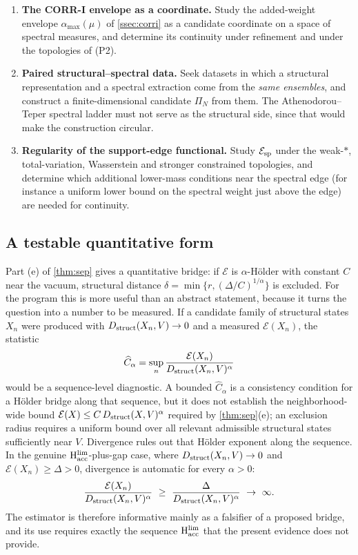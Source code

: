 \documentclass[11pt,a4paper]{article}
\theoremstyle{definition}
\theoremstyle{remark}
\newcommand{\Hacc}{\mathrm{H}_{\mathrm{acc}}}
\begin{document}
\begin{enumerate}[label=(P\arabic*),start=5]
\item \textbf{The CORR-I envelope as a coordinate.} Study the added-weight envelope $\alpha_{\max}(\mu)$ of \cref{ssec:corri} as a candidate coordinate on a space of spectral measures, and determine its continuity under refinement and under the topologies of (P2).
\item \textbf{Paired structural--spectral data.} Seek datasets in which a structural representation and a spectral extraction come from the \emph{same ensembles}, and construct a finite-dimensional candidate $\Pi_N$ from them. The Athenodorou--Teper spectral ladder must not serve as the structural side, since that would make the construction circular.
\item \textbf{Regularity of the support-edge functional.} Study $\mathcal E_{\rm sp}$ under the weak-$*$, total-variation, Wasserstein and stronger constrained topologies, and determine which additional lower-mass conditions near the spectral edge (for instance a uniform lower bound on the spectral weight just above the edge) are needed for continuity.
\end{enumerate}

\subsection{A testable quantitative form}\label{ssec:holder}
Part (e) of \cref{thm:sep} gives a quantitative bridge: if $\mathcal E$ is $\alpha$-H\"older with constant $C$ near the vacuum, structural distance $\delta=\min\{r,(\Delta/C)^{1/\alpha}\}$ is excluded. For the program this is more useful than an abstract statement, because it turns the question into a number to be measured. If a candidate family of structural states $X_n$ were produced with $D_{\rm struct}(X_n,V)\to0$ and a measured $\mathcal E(X_n)$, the statistic
\[
\widehat C_\alpha=\sup_n \frac{\mathcal E(X_n)}{D_{\rm struct}(X_n,V)^{\alpha}}
\]
would be a sequence-level diagnostic. A bounded $\widehat C_\alpha$ is a consistency condition for a H\"older bridge along that sequence, but it does not establish the neighborhood-wide bound $\mathcal E(X)\le C\,D_{\rm struct}(X,V)^{\alpha}$ required by \cref{thm:sep}(e); an exclusion radius requires a uniform bound over all relevant admissible structural states sufficiently near $V$. Divergence rules out that H\"older exponent along the sequence. In the genuine $\Hacc^{\rm lim}$-plus-gap case, where $D_{\rm struct}(X_n,V)\to0$ and $\mathcal E(X_n)\ge\Delta>0$, divergence is automatic for every $\alpha>0$:
\[
\frac{\mathcal E(X_n)}{D_{\rm struct}(X_n,V)^{\alpha}}\ \ge\ \frac{\Delta}{D_{\rm struct}(X_n,V)^{\alpha}}\ \to\ \infty .
\]
The estimator is therefore informative mainly as a falsifier of a proposed bridge, and its use requires exactly the sequence $\Hacc^{\rm lim}$ that the present evidence does not provide.
\end{document}
